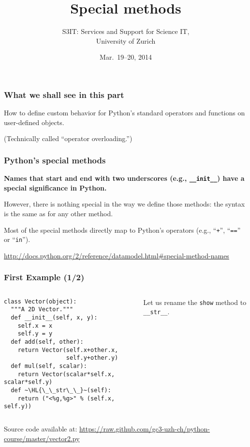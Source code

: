 \documentclass[english,serif,mathserif,xcolor=pdftex,dvipsnames,table]{beamer}
\title[Special methods]{%
  Special methods
}
\author[S3IT]{%
  S3IT: Services and Support for Science IT, \\
  University of Zurich
}
\date{Mar.~19--20, 2014}
\begin{document}
\maketitle


\begin{frame}
  \frametitle{What we shall see in this part}

  How to define custom behavior for Python's standard operators and
  functions on user-defined objects.

  \+
  (Technically called ``operator overloading.'')
\end{frame}


\begin{frame}[fragile]
  \frametitle{Python's special methods}

  \textbf{Names that start and end with two underscores (e.g.,
    \lstinline|__init__|) have a special significance in Python.}

  \+
  However, there is nothing special in the way we define those
  methods: the syntax is the same as for any other method.

  \+ Most of the special methods directly map to Python's operators (e.g.,
  ``\texttt{+}'', ``\texttt{==}'' or ``\texttt{in}'').

  \+
  \begin{references}
    \url{http://docs.python.org/2/reference/datamodel.html#special-method-names}
  \end{references}
\end{frame}


\begin{frame}[fragile]
  \frametitle{First Example (1/2)}
  \begin{columns}[t]
    \begin{column}{0.5\textwidth}
\begin{lstlisting}
class Vector(object):
  """A 2D Vector."""
  def __init__(self, x, y):
    self.x = x
    self.y = y
  def add(self, other):
    return Vector(self.x+other.x,
                  self.y+other.y)
  def mul(self, scalar):
    return Vector(scalar*self.x, scalar*self.y)
  def ~\HL{\_\_str\_\_}~(self):
    return ("<%g,%g>" % (self.x, self.y))
\end{lstlisting}
    \end{column}
    \begin{column}{0.5\textwidth}
      \raggedleft
      Let us rename the \texttt{show} method to \texttt{\_\_str\_\_}.
    \end{column}
  \end{columns}

  \+
  {\scriptsize Source code available at:
    \url{https://raw.github.com/gc3-uzh-ch/python-course/master/vector2.py}}
\end{frame}
\end{document}
